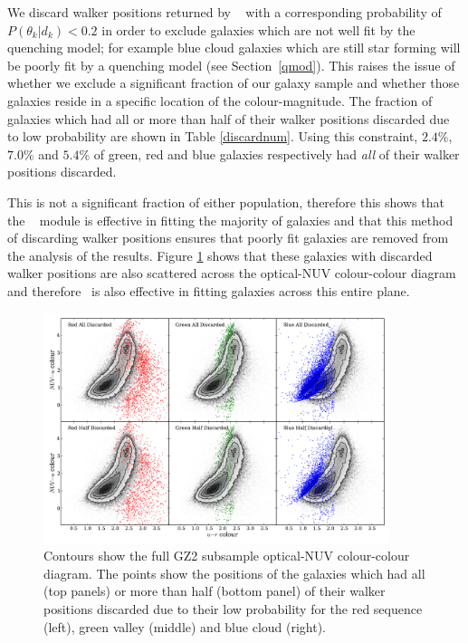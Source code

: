 We discard walker positions returned by \starpy~ with a corresponding probability of $P(\theta_k|d_k) < 0.2$ in order to exclude galaxies which are not well fit by the quenching model; for example blue cloud galaxies which are still star forming will be poorly fit by a quenching model (see Section~\ref{qmod}). This raises the issue of whether we exclude a significant fraction of our galaxy sample and whether those galaxies reside in a specific location of the colour-magnitude. The fraction of galaxies which had all or more than half of their walker positions discarded due to low probability are shown in Table \ref{discardnum}. Using this constraint, $2.4\%$, $7.0\%$ and $5.4\%$ of green, red and blue galaxies respectively had \emph{all} of their walker positions discarded. 

This is not a significant fraction of either population, therefore this shows that the \starpy~ module is effective in fitting the majority of galaxies and that this method of discarding walker positions ensures that poorly fit galaxies are removed from the analysis of the results. Figure \ref{discarded} shows that these galaxies with discarded walker positions are also scattered across the optical-NUV colour-colour diagram and therefore \starpy ~is also effective in fitting galaxies across this entire plane. 

\begin{figure}
\includegraphics[width=0.9\textwidth]{starpy/discarded_galaxy_colour_colour.pdf}
\caption{Contours show the full GZ2 subsample optical-NUV colour-colour diagram. The points show the positions of the galaxies which had all (top panels) or more than half (bottom panel) of their walker positions discarded due to their low probability for the red sequence (left), green valley (middle) and blue cloud (right).}
\label{discarded}
\end{figure}



